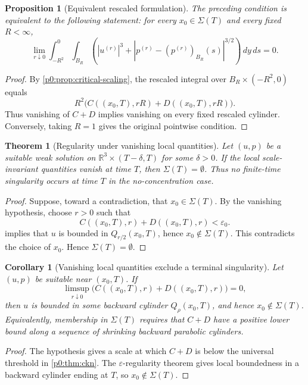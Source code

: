 \documentclass[11pt]{amsart}
\theoremstyle{plain}
\newtheorem{theorem}{Theorem}[section]
\newtheorem{proposition}[proposition]{Proposition}
\newtheorem{corollary}[corollary]{Corollary}
\theoremstyle{definition}
\theoremstyle{remark}
\numberwithin{equation}{section}
\begin{document}
\begin{proposition}[Equivalent rescaled formulation]
\label{p0:prop:vanishing-rescaled}
The preceding condition is equivalent to the following statement: for every
\(x_0\in\Sigma(T)\) and every fixed \(R<\infty\),
\[
  \lim_{r\downarrow0}
  \int_{-R^2}^{0}\int_{B_R}
  \left(
  |u^{(r)}|^3+
  |p^{(r)}-(p^{(r)})_{B_R}(s)|^{3/2}
  \right)\,dy\,ds=0.
\]
\end{proposition}

\begin{proof}
By \cref{p0:prop:critical-scaling}, the rescaled integral over
\(B_R\times(-R^2,0)\) equals
\[
  R^2\bigl(C((x_0,T),rR)+D((x_0,T),rR)\bigr).
\]
Thus vanishing of \(C+D\) implies vanishing on every fixed rescaled cylinder.
Conversely, taking \(R=1\) gives the original pointwise condition.
\end{proof}

\begin{theorem}[Regularity under vanishing local quantities]\label{p0:thm:no-concentration}
Let \((u,p)\) be a suitable weak solution on
\(\mathbb R^3\times(T-\delta,T)\) for some \(\delta>0\).  If the local
scale-invariant quantities vanish at time \(T\), then
\(\Sigma(T)=\emptyset\).  Thus no finite-time singularity occurs at time \(T\)
in the no-concentration case.
\end{theorem}

\begin{proof}
Suppose, toward a contradiction, that \(x_0\in\Sigma(T)\).  By the vanishing
hypothesis, choose \(r>0\) such that
\[
  C((x_0,T),r)+D((x_0,T),r)<\varepsilon_0.
\]
 implies that \(u\) is bounded in \(Q_{r/2}(x_0,T)\), hence
\(x_0\notin\Sigma(T)\).  This contradicts the choice of \(x_0\).  Hence
\(\Sigma(T)=\emptyset\).
\end{proof}

\begin{corollary}[Vanishing local quantities exclude a terminal singularity]
\label{p0:cor:escape}
Let \((u,p)\) be suitable near \((x_0,T)\).  If
\[
  \limsup_{r\downarrow0}
  \bigl(C((x_0,T),r)+D((x_0,T),r)\bigr)=0,
\]
then \(u\) is bounded in some backward cylinder \(Q_\rho(x_0,T)\), and hence
\(x_0\notin\Sigma(T)\).  Equivalently, membership in \(\Sigma(T)\) requires
that \(C+D\) have a positive lower bound along a sequence of shrinking backward
parabolic cylinders.
\end{corollary}

\begin{proof}
The hypothesis gives a scale at which \(C+D\) is below the universal threshold
in \cref{p0:thm:ckn}.  The \(\varepsilon\)-regularity theorem gives local boundedness in
a backward cylinder ending at \(T\), so \(x_0\notin\Sigma(T)\).
\end{proof}
\end{document}
